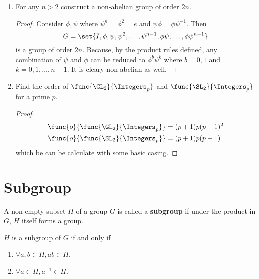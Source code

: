 \begin{enumerate}
\begin{proof}
        Let \(A = \set<g>{g \neq g^{-1}}\) and \(B = \set<g>{g = g^{-1}}\). Note that, \(\abs{A}\) is even since  \(g  \in A \implies g^{-1} \in A\). Moreover, \(\func{o}{G} = \abs{A} + \abs{B}\), therefore \(\abs{B}\) must be even and since \(e \in B\), \(\abs{B} \geq 2\).
    \end{proof}
    \item For any \(n > 2\) construct a non-abelian group of order \(2n\).
    \begin{proof}
        Consider \(\phi, \psi\) where \(\psi^n = \phi^2 = e \) and \(\psi \phi = \phi \psi^{-1}\). Then
        \begin{equation*}
            G = \set{I, \phi ,\psi, \psi^2, \dots ,\psi^{n-1}, \phi \psi, \dots , \phi \psi^{n-1}}
        \end{equation*}
        is a group of order \(2n\). Because, by the product rules defined, any combination of \(\psi\) and \(\phi\) can be reduced to \(\phi^b \psi^k\) where \(b = 0,1\) and \(k = 0,1 , \dots, n-1\). It is cleary non-abelian as well.
    \end{proof}
    \item Find the order of \(\func{\GL_2}{\Integers_p}\) and \(\func{\SL_2}{\Integers_p}\) for a prime \(p\).
    \begin{proof}
        \begin{align*}
            \func{o}{\func{\GL_2}{\Integers_p}} &= (p+1) p (p-1)^2\\
            \func{o}{\func{\SL_2}{\Integers_p}} &= (p+1) p (p-1)
        \end{align*}
        which be can be calculate with some basic casing.
    \end{proof}
\end{enumerate}

\section{Subgroup}
\begin{definition}
    A non-empty subset \(H\) of a group \(G\) is called a \textbf{subgroup} if under the product in \(G\), \(H\) itself forms a group.
\end{definition}

\begin{lemma}\label{lm:subgroupConditions}
    \(H\) is a subgroup of \(G\) if and only if 
    \begin{enumerate}
        \item \(\forall a,b \in H, ab \in H\).
        \item \(\forall a \in H, a^{-1} \in H\).
    \end{enumerate}
\end{lemma}

